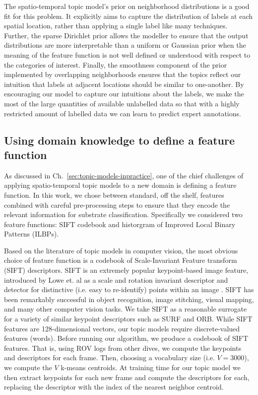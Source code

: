The spatio-temporal topic model's prior on neighborhood distributions is a good fit for this problem. It explicitly aims to capture the distribution of labels at each spatial location, rather than applying a single label like many techniques. Further, the sparse Dirichlet prior allows the modeller to ensure that the output distributions are more interpretable than a uniform or Gaussian prior when the meaning of the feature function is not well defined or understood with respect to the categories of interest. Finally, the smoothness component of the prior implemented by overlapping neighborhoods ensures that the topics reflect our intuition that labels at adjacent locations should be similar to one-another. By encouraging our model to capture our intuitions about the labels, we make the most of the large quantities of available unlabelled data so that with a highly restricted amount of labelled data we can learn to predict expert annotations.

\subsection{Using domain knowledge to define a feature function}

As discussed in Ch.~\ref{sec:topic-models-inpractice}, one of the chief challenges of applying spatio-temporal topic models to a new domain is defining a feature function. In this work, we chose between standard, off the shelf, features combined with careful pre-processing steps to ensure that they encode the relevant information for substrate classification. Specifically we considered two feature functions: SIFT codebook and historgram of Improved Local Binary Patterns (ILBPs).

Based on the literature of topic models in computer vision, the most obvious choice of feature function is a codebook of Scale-Invariant Feature transform (SIFT) descriptors. SIFT is an extremely popular keypoint-based image feature, introduced by Lowe et. al as a scale and rotation invariant descriptor and detector for distinctive (i.e. easy to re-identify) points within an image \citep{Lowe2004}. SIFT has been remarkably successful in object recognition, image stitching, visual mapping, and many other computer vision tasks. We take SIFT as a reasonable surrogate for a variety of similar keypoint descriptors such as SURF and ORB. While SIFT features are 128-dimensional vectors, our topic models require discrete-valued features (words). Before running our algorithm, we produce a codebook of SIFT features. That is, using ROV logs from other dives, we compute the keypoints and descriptors for each frame. Then, choosing a vocabulary size (i.e. $V = 3000$), we compute the $V$ k-means centroids. At training time for our topic model we then extract keypoints for each new frame and compute the descriptors for each, replacing the descriptor with the index of the nearest neighbor centroid.

